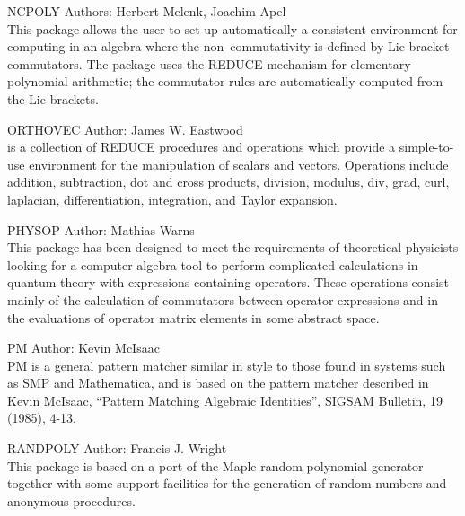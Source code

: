 \begin{Package}{NCPOLY}
Authors: Herbert Melenk, Joachim Apel\\

This package allows the user to set up automatically a consistent
environment for computing in an algebra where the non--commutativity is
defined by Lie-bracket commutators.  The package uses the REDUCE
 mechanism for elementary polynomial arithmetic; the commutator
rules are automatically computed from the Lie brackets.
\end{Package}

\begin{Package}{ORTHOVEC}
Author: James W. Eastwood\\

 is a collection of REDUCE procedures and operations which
provide a simple-to-use environment for the manipulation of scalars and
vectors.  Operations include addition, subtraction, dot and cross
products, division, modulus, div, grad, curl, laplacian, differentiation,
integration, and Taylor expansion.
\end{Package}

\begin{Package}{PHYSOP}
Author: Mathias Warns\\

This package has been designed to meet the requirements of theoretical
physicists looking for a computer algebra tool to perform complicated
calculations in quantum theory with expressions containing operators.
These operations consist mainly of the calculation of commutators between
operator expressions and in the evaluations of operator matrix elements in
some abstract space.
\end{Package}

\begin{Package}{PM}
Author: Kevin McIsaac\\

PM is a general pattern matcher similar in style to those found in systems
such as SMP and Mathematica, and is based on the pattern matcher described
in Kevin McIsaac, ``Pattern Matching Algebraic Identities'', SIGSAM Bulletin,
19 (1985), 4-13.
\end{Package}

\begin{Package}{RANDPOLY}
Author: Francis J. Wright\\

This package is based on a port of the Maple random polynomial
generator together with some support facilities for the generation
of random numbers and anonymous procedures.
\end{Package}


